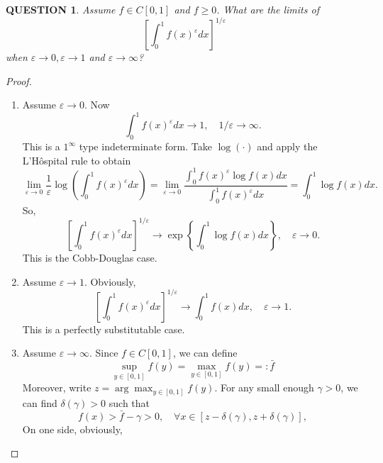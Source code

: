 \documentclass[12pt]{article}
\renewcommand{\(}{\left(}%
\renewcommand{\)}{\right)}%
\renewcommand{\[}{\left[}%
\renewcommand{\]}{\right]}%
\newtheorem{question}{QUESTION}[section]}
\newtheorem{proof}{Proof.}}
\begin{document}
\begin{question}
  	Assume $f\in C[0,1]$ and $f\geq 0$. What are the limits of 
  	\begin{equation}\label{1}
  		\[\int_0^1 f(x)^\varepsilon dx\]^{1/\varepsilon}
  	\end{equation}
  	when $\varepsilon\to 0,\varepsilon\to 1$ and $\varepsilon\to \infty$?
  \end{question}
  \begin{proof}
  	\begin{enumerate}[(1)]
  		\item Assume $\varepsilon\to 0$. Now 
  		\begin{equation*}
  			\int_0^1 f(x)^\varepsilon dx\to 1,\quad 1/\varepsilon\to \infty.
  		\end{equation*}
  		This is a $1^\infty$ type indeterminate form. Take $\log(\cdot)$ and apply the L'H\^ospital rule to obtain
  		\begin{equation*}
  			\lim_{\varepsilon\to 0}\frac{1}{\varepsilon}\log\(\int_0^1 f(x)^\varepsilon dx\)=\lim_{\varepsilon\to 0}\frac{\int_0^1f(x)^{\varepsilon}\log f(x)dx}{\int_0^1 f(x)^\varepsilon dx}=\int_0^1\log f(x)dx.
  		\end{equation*}
  		So,
  		\begin{equation*}
  			\[\int_0^1 f(x)^\varepsilon dx\]^{1/\varepsilon}\to \exp\left\{\int_0^1\log f(x)dx\right\},\quad \varepsilon\to0.
  		\end{equation*}
  		This is the Cobb-Douglas case.
  		\item Assume $\varepsilon\to1$. Obviously,
  		\begin{equation*}
  			\[\int_0^1 f(x)^\varepsilon dx\]^{1/\varepsilon}\to \int_0^1 f(x)dx,\quad \varepsilon\to1.
  		\end{equation*}
  		This is a perfectly substitutable case.
  		\item Assume $\varepsilon\to\infty$. Since $f\in C[0,1]$, we can define
  		\begin{equation*}
  			\sup_{y\in[0,1]}f(y)=\max_{y\in[0,1]}f(y)=:\bar{f} 
  		\end{equation*}
  		Moreover, write $z=\arg\max_{y\in[0,1]}f(y)$. For any small enough $\gamma>0$, we can find $\delta(\gamma)>0$ such that 
  		\begin{equation}\label{2}
  			f(x)>\bar{f}-\gamma>0,\quad \forall x\in[z-\delta(\gamma),z+\delta(\gamma)],
  		\end{equation} 
  		On one side, obviously, 
  		\begin{equation*}

\end{equation*}
\end{enumerate}
\end{proof}
\end{document}
